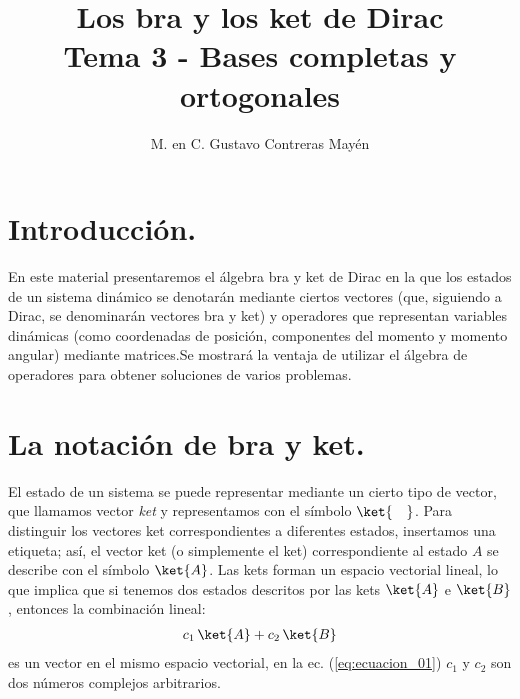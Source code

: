 
\title{Los bra y los ket de Dirac \\ \large {Tema 3 - Bases completas y ortogonales}\vspace{-3ex}}

\author{M. en C. Gustavo Contreras Mayén}
\date{ }

\pagestyle{fancy}
\fancyhf{}
\lhead{\leftmark}
\rfoot{\thepage}
\setlength{\headheight}{16pt}%



\maketitle
\fontsize{14}{14}\selectfont
\tableofcontents
\newpage

\section{Introducción.}

En este material presentaremos el álgebra bra y ket de Dirac en la que los estados de un sistema dinámico se denotarán mediante ciertos vectores (que, siguiendo a Dirac, se denominarán vectores bra y ket) y operadores que representan variables dinámicas (como coordenadas de posición, componentes del momento y momento angular) mediante matrices.Se mostrará la ventaja de utilizar el álgebra de operadores para obtener soluciones de varios problemas.

\section{La notación de bra y ket.}

El estado de un sistema se puede representar mediante un cierto tipo de vector, que llamamos vector \emph{ket} y representamos con el símbolo $\ket{ \quad }$. Para distinguir los vectores ket correspondientes a diferentes estados, insertamos una etiqueta; así, el vector ket (o simplemente el ket) correspondiente al estado $A$ se describe con el símbolo $\ket{A}$. Las kets forman un espacio vectorial lineal, lo que implica que si tenemos dos estados descritos por las kets $\ket{A}$ e $\ket{B}$, entonces la combinación lineal:
\begin{align}
c_{1} \, \ket{A} + c_{2} \, \ket{B}
\label{eq:ecuacion_01}
\end{align}
es un vector en el mismo espacio vectorial, en la ec. (\ref{eq:ecuacion_01}) $c_{1}$ y $c_{2}$ son dos números complejos arbitrarios.

